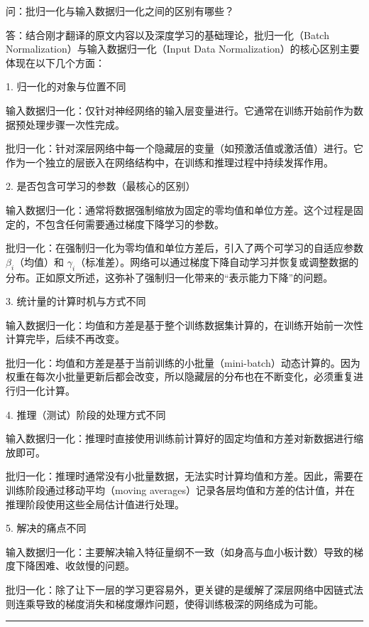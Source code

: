 \documentclass{article}
\begin{document}
{\color{blue}
问：批归一化与输入数据归一化之间的区别有哪些？

答：结合刚才翻译的原文内容以及深度学习的基础理论，批归一化（Batch Normalization）与输入数据归一化（Input Data Normalization）的核心区别主要体现在以下几个方面：

1. 归一化的对象与位置不同

输入数据归一化：仅针对神经网络的输入层变量进行。它通常在训练开始前作为数据预处理步骤一次性完成。

批归一化：针对深层网络中每一个隐藏层的变量（如预激活值或激活值）进行。它作为一个独立的层嵌入在网络结构中，在训练和推理过程中持续发挥作用。

2. 是否包含可学习的参数（最核心的区别）

输入数据归一化：通常将数据强制缩放为固定的零均值和单位方差。这个过程是固定的，不包含任何需要通过梯度下降学习的参数。

批归一化：在强制归一化为零均值和单位方差后，引入了两个可学习的自适应参数 $\beta_i$（均值）和 $\gamma_i$（标准差）。网络可以通过梯度下降自动学习并恢复或调整数据的分布。正如原文所述，这弥补了强制归一化带来的“表示能力下降”的问题。

3. 统计量的计算时机与方式不同

输入数据归一化：均值和方差是基于整个训练数据集计算的，在训练开始前一次性计算完毕，后续不再改变。

批归一化：均值和方差是基于当前训练的小批量（mini-batch）动态计算的。因为权重在每次小批量更新后都会改变，所以隐藏层的分布也在不断变化，必须重复进行归一化计算。

4. 推理（测试）阶段的处理方式不同

输入数据归一化：推理时直接使用训练前计算好的固定均值和方差对新数据进行缩放即可。

批归一化：推理时通常没有小批量数据，无法实时计算均值和方差。因此，需要在训练阶段通过移动平均（moving averages）记录各层均值和方差的估计值，并在推理阶段使用这些全局估计值进行处理。

5. 解决的痛点不同

输入数据归一化：主要解决输入特征量纲不一致（如身高与血小板计数）导致的梯度下降困难、收敛慢的问题。

批归一化：除了让下一层的学习更容易外，更关键的是缓解了深层网络中因链式法则连乘导致的梯度消失和梯度爆炸问题，使得训练极深的网络成为可能。



}

\noindent\rule{\linewidth}{0.4pt}
\end{document}
